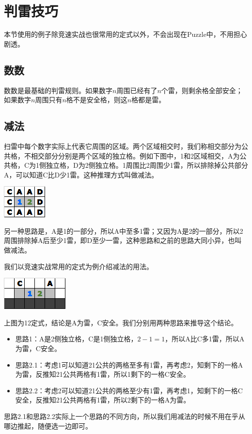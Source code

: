\section{判雷技巧}
本节使用的例子除竞速实战也很常用的定式以外，不会出现在Puzzle中，不用担心剧透。

\subsection{数数}
数数是最基础的判雷规则。如果数字$n$周围已经有了$n$个雷，则剩余格全部安全；如果数字$n$周围只有$n$格不是安全格，则这$n$格都是雷。

\subsection{减法}
扫雷中每个数字实际上代表它周围的区域。两个区域相交时，我们称相交部分为公共格，不相交部分分别是两个区域的独立格。例如下图中，1和2区域相交，A为公共格，C为1侧独立格，D为2侧独立格。1周围比2周围少1雷，所以排除掉公共部分A，可以知道C比D少1雷。这种推理方式叫做减法。
\begin{center}
    \includegraphics{trick/减法1.png}
\end{center}

另一种思路是，A是1的一部分，所以A中至多1雷；又因为A是2的一部分，所以2周围排除掉A后至少1雷，即D至少一雷，这种思路和之前的思路大同小异，也叫做减法。

我们以竞速实战常用的定式为例介绍减法的用法。

\vspace{5mm}
\begin{center}
    \includegraphics{trick/减法2.png}
\end{center}
上图为12定式，结论是A为雷，C安全。我们分别用两种思路来推导这个结论。
\begin{itemize}
    \item 思路1：A是2侧独立格，C是1侧独立格，$2-1=1$，所以A比C多1雷，所以A为雷，C安全。
    \item 思路2.1：考虑1可以知道21公共的两格至多有1雷，再考虑2，知剩下的一格A为雷，反推知21公共两格有1雷，所以1剩下的一格C安全。
    \item 思路2.2：考虑2可以知道21公共的两格至少有1雷，再考虑1，知剩下的一格C安全，反推知21公共两格有1雷，所以2剩下的一格A为雷。
\end{itemize}
思路2.1和思路2.2实际上一个思路的不同方向，所以我们用减法的时候不用在乎从哪边推起，随便选一边即可。


